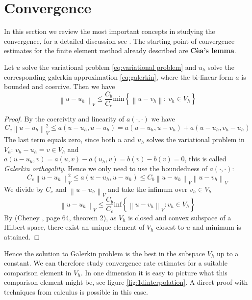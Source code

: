 \documentclass[../Main/main.tex]{subfiles}
\begin{document}
	\section*{Convergence}

	In this section we review the most important concepts in studying the convergence, for a detailed discussion see \cite{Knabner}.
	The starting point of convergence estimates for the finite element method already described are \textbf{Cèa's lemma}. 
	\begin{theorem}
		Let $u$ solve the variational problem \eqref{eq:variational problem} and $u_h$ solve the corresponding galerkin approximation \eqref{eq:galerkin}, where the bi-linear form $a$ is bounded and coercive. Then we have
		\begin{equation}
			\left \| u-u_h \right \|_V \leq \frac{C_b}{C_c}\text{min} \left \{ \left \| u-v_h \right \|: \ v_h \in V_h \right \}
		\end{equation}
		
	\end{theorem}
	\begin{proof}
		By the coercivity and linearity of $a(\cdot,\cdot)$ we have
		\begin{equation*}
			C_c \left \| u-u_h \right \|^2_V \leq a(u-u_h,u-u_h) = a(u-u_h,u-v_h) + a(u-u_h, v_h - u_h)
		\end{equation*}
		The last term equals zero, since both $u$ and $u_h$ solves the variational problem in $V_h$: $v_h-u_h = v \in V_h$ and $a(u-u_h,v) = a(u,v)-a(u_h,v) = b(v)-b(v) = 0$, this is called \emph{Galerkin orthogality}. Hence we only need to use the boundedness of $a(\cdot,\cdot)$:
		\begin{equation*}
			C_c \left \| u-u_h \right \|^2_V \leq a(u-u_h,u-u_h) \leq C_b \left \| u-u_h \right \|_V \left \| u-v_h \right \|_V
		\end{equation*}
		We divide by $C_c$ and $\left \| u-u_h \right \|_V$ and take the infimum over $v_h \in V_h$
		\begin{equation*}
			\left \| u-u_h \right \|_V \leq \frac{C_b}{C_c} \text{inf} \left \{ \left \| u-v_h \right \|_V: v_h \in V_h \right \}
		\end{equation*}
		By (Cheney \cite{Cheney}, page 64, theorem 2), as $V_h$ is closed and convex subspace of a Hilbert space, there exist an unique element of $V_h$ closest to $u$ and minimum is attained.  
	\end{proof}
	Hence the solution to Galerkin problem is the best in the subspace $V_h$ up to a constant. We can therefore study convergence rate estimates for a suitable comparison element in $V_h$. In one dimension it is easy to picture what this comparison element might be, see figure \ref{fig:1dinterpolation}. A direct proof with techniques from calculus is possible in this case.\\
\end{document}
